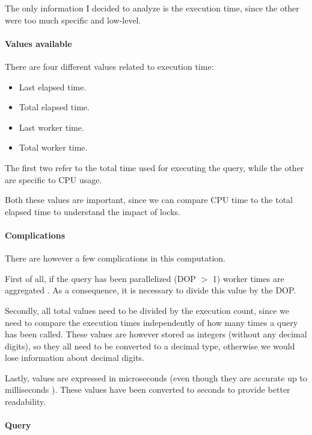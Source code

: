     The only information I decided to analyze is the execution time, since the other were too much specific and low-level.
        
    \paragraph{Values available}
        There are four different values related to execution time:
            \begin{itemize}
                \item Last elapsed time.
                \item Total elapsed time.
                \item Last worker time.
                \item Total worker time.
            \end{itemize}
            
        The first two refer to the total time used for executing the query, while the other are specific to CPU usage.
        
        Both these values are important, since we can compare CPU time to the total elapsed time to understand the impact of locks.
    
    \paragraph{Complications}
        There are however a few complications in this computation.
        
        First of all, if the query has been parallelized (DOP $>$ 1) worker times are aggregated \cite{bib:tests:perf:dmv_time}.
        As a consequence, it is necessary to divide this value by the DOP.
        
        Secondly, all total values need to be divided by the execution count, since we need to compare the execution times independently of how many times a query has been called.
        These values are however stored as integers (without any decimal digits), so they all need to be converted to a decimal type, otherwise we would lose information about decimal digits.
        
        Lastly, values are expressed in microseconds (even though they are accurate up to milliseconds \cite{bib:tests:perf:dmv_doc}).
        These values have been converted to seconds to provide better readability.
        
    \paragraph{Query}
    
